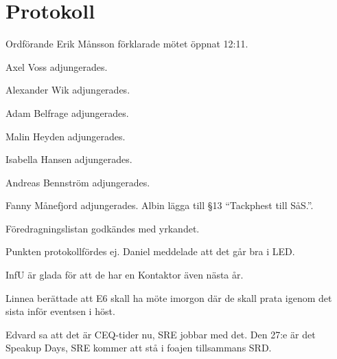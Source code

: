 \documentclass[10pt]{article}
\def\mo{Erik Månsson}
\begin{document}
\section*{Protokoll}
\begin{paragrafer}
Ordförande {\mo} förklarade mötet öppnat 12:11.

{\valavmo}

{\valavms}

{\valavj}

{\tosg}


Axel Voss adjungerades.

Alexander Wik adjungerades.

Adam Belfrage adjungerades.

Malin Heyden adjungerades.

Isabella Hansen adjungerades.

Andreas Bennström adjungerades.

Fanny Månefjord adjungerades.
Albin \ypa lägga till \S13 ``Tackphest till SåS.''.

Föredragningslistan godkändes med yrkandet.


\begin{fyllnadsval} %
\end{fyllnadsval}

\begin{paragrafer}
Punkten protokollfördes ej.
Daniel meddelade att det går bra i LED.

InfU är glada för att de har en Kontaktor även nästa år.

Linnea berättade att E6 skall ha möte imorgon där de skall prata igenom det sista inför eventsen i höst.

Edvard sa att det är CEQ-tider nu, SRE jobbar med det. Den 27:e är det Speakup Days, SRE kommer att stå i foajen tillsammans SRD.


\end{paragrafer}
\end{paragrafer}
\end{document}
